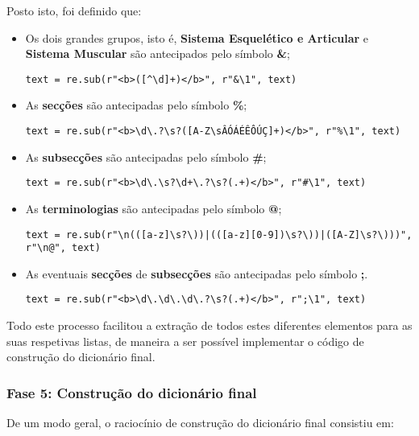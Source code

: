 Posto isto, foi definido que:

\begin{itemize}
    \item Os dois grandes grupos, isto é, \textbf{Sistema Esquelético e Articular} e \textbf{Sistema Muscular} são antecipados pelo símbolo \textbf{\&};
    \begin{lstlisting}[style=pythonstyle]
text = re.sub(r"<b>([^\d]+)</b>", r"&\1", text)
\end{lstlisting}

    \item As \textbf{secções} são antecipadas pelo símbolo \textbf{\%};
    \begin{lstlisting}[style=pythonstyle]
text = re.sub(r"<b>\d\.?\s?([A-Z\sÂÓÁÉÊÔÚÇ]+)</b>", r"%\1", text)
\end{lstlisting}

    \item As \textbf{subsecções} são antecipadas pelo símbolo \textbf{\#};
    \begin{lstlisting}[style=pythonstyle]
text = re.sub(r"<b>\d\.\s?\d+\.?\s?(.+)</b>", r"#\1", text)
\end{lstlisting}

    \item As \textbf{terminologias} são antecipadas pelo símbolo \textbf{@};
    \begin{lstlisting}[style=pythonstyle]
text = re.sub(r"\n(([a-z]\s?\))|(([a-z][0-9])\s?\))|([A-Z]\s?\)))", r"\n@", text)
\end{lstlisting}

    \item As eventuais \textbf{secções} de \textbf{subsecções} são antecipadas pelo símbolo \textbf{;}.
    \begin{lstlisting}[style=pythonstyle]
text = re.sub(r"<b>\d\.\d\.\d\.?\s?(.+)</b>", r";\1", text) 
\end{lstlisting}
\end{itemize}

Todo este processo facilitou a extração de todos estes diferentes elementos para as suas respetivas listas, de maneira a ser possível implementar o código de construção do dicionário final.

\subsubsection{Fase 5: Construção do dicionário final}

De um modo geral, o raciocínio de construção do dicionário final consistiu em:


